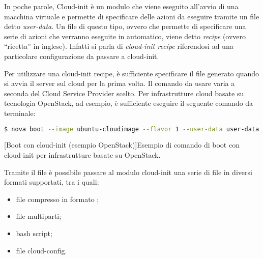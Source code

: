             In poche parole, Cloud-init è un modulo che viene eseguito all'avvio di una macchina virtuale e permette di specificare delle azioni da eseguire tramite un file detto \textit{user-data}. Un file di questo tipo, ovvero che permette di specificare una serie di azioni che verranno eseguite in automatico, viene detto \textit{recipe} (ovvero ``ricetta'' in inglese). Infatti si parla di \textit{cloud-init recipe} riferendosi ad una particolare configurazione da passare a cloud-init.
            
            Per utilizzare una cloud-init recipe, è sufficiente specificare il file  generato quando si avvia il server sul cloud per la prima volta. Il comando da usare varia a seconda del Cloud Service Provider scelto. Per infrastrutture cloud basate su tecnologia OpenStack, ad esempio, è sufficiente eseguire il seguente comando da terminale:
            
            \begin{center}
                \begin{minipage}{\linewidth}
                    \begin{lstlisting}[language=bash, gobble=22]
                        $ nova boot --image ubuntu-cloudimage --flavor 1 --user-data user-data
                    \end{lstlisting}
                    \captionsetup{textformat=empty,labelformat=empty} \vspace{-2em}
                    [Boot con cloud-init (esempio OpenStack)]{Esempio di comando di boot con cloud-init per infrastrutture basate su OpenStack.}
                \end{minipage}
            \end{center}
            
            Tramite il file  è possibile passare al modulo cloud-init una serie di file in diversi formati supportati, tra i quali:
            
            \begin{itemize}
                \item file compresso in formato ;
                \item file  multiparti;
                \item bash script;
                \item file cloud-config.
            \end{itemize}
            
